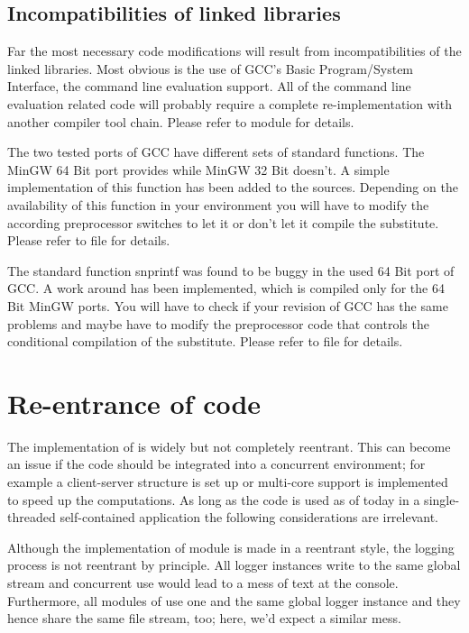 \subsection{Incompatibilities of linked libraries}

Far the most necessary code modifications will result from
incompatibilities of the linked libraries. Most obvious is the use of
GCC's Basic Program/System Interface, the command line evaluation support.
All of the command line evaluation related code will probably require a
complete re-implementation with another compiler tool chain. Please refer
to module  for details.

The two tested ports of GCC have different sets of standard functions. The
MinGW 64 Bit port provides  while MinGW 32 Bit doesn't. A
simple implementation of this function has been added to the \linnet{}
sources. Depending on the availability of this function in your
environment you will have to modify the according preprocessor switches to
let it or don't let it compile the substitute. Please refer to file
 for details.

The standard function snprintf was found to be buggy in the used 64 Bit
port of GCC. A work around has been implemented, which is compiled only
for the 64 Bit MinGW ports. You will have to check if your revision of GCC
has the same problems and maybe have to modify the preprocessor code that
controls the conditional compilation of the substitute. Please refer to
file  for details.


\section{Re-entrance of code}

The implementation of \linnet{} is widely but not completely reentrant.
This can become an issue if the code should be integrated into a
concurrent environment; for example a client-server structure is set up or
multi-core support is implemented to speed up the computations. As long as
the code is used as of today in a single-threaded self-contained
application the following considerations are irrelevant.

Although the implementation of module  is made in a reentrant
style, the logging process is not reentrant by principle. All logger
instances write to the same global stream  and concurrent
use would lead to a mess of text at the console. Furthermore, all modules
of \linnet{} use one and the same global logger instance and they hence
share the same file stream, too; here, we'd expect a similar mess.

